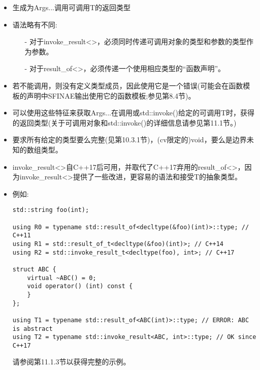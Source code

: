 \begin{itemize}
\item 
生成为Args...调用可调用T的返回类型

\item 
语法略有不同:

\begin{itemize}
\item [-]
对于invoke\_result<>，必须同时传递可调用对象的类型和参数的类型作为参数。

\item [-]
对于result\_of<>，必须传递一个使用相应类型的“函数声明”。
\end{itemize}

\item 
若不能调用，则没有定义类型成员，因此使用它是一个错误(可能会在函数模板的声明中SFINAE输出使用它的函数模板;参见第8.4节)。

\item 
可以使用这些特征来获取Args...在调用或std::invoke()给定的可调用T时，获得的返回类型(关于可调用对象和std::invoke()的详细信息请参见第11.1节。)

\item 
要求所有给定的类型要么完整(见第10.3.1节)，(cv限定的)void，要么是边界未知的数组类型。

\item 
invoke\_result<>自C++17后可用，并取代了C++17弃用的result\_of<>，因为invoke\_result<>提供了一些改进，更容易的语法和接受T的抽象类型。

\item 
例如:
\begin{lstlisting}[style=styleCXX]
std::string foo(int);

using R0 = typename std::result_of<decltype(&foo)(int)>::type; // C++11
using R1 = std::result_of_t<decltype(&foo)(int)>; // C++14
using R2 = std::invoke_result_t<decltype(foo), int>; // C++17

struct ABC {
	virtual ~ABC() = 0;
	void operator() (int) const {
	}
};

using T1 = typename std::result_of<ABC(int)>::type; // ERROR: ABC is abstract
using T2 = typename std::invoke_result<ABC, int>::type; // OK since C++17
\end{lstlisting}

请参阅第11.1.3节以获得完整的示例。

\end{itemize}

\newpage


